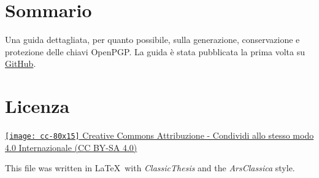 \begingroup
	\footnotesize

	\section*{Sommario}
	Una guida dettagliata, per quanto possibile, sulla generazione,
	conservazione e protezione delle chiavi OpenPGP. La guida è stata pubblicata
	la prima volta su
	\href{https://github.com/aldolat/generazione-sicura-chiavi-openpgp}{GitHub}.

	\section*{Licenza}
	\href{https://creativecommons.org/licenses/by-sa/4.0/deed.it}{\texttt{[image: cc-80x15]}
	Creative Commons Attribuzione - Condividi allo stesso modo 4.0 Internazionale
	(CC BY-SA 4.0)} \bigskip

	\vfill

	\noindent This file was written in \LaTeX~with \textit{ClassicThesis} and
	the \textit{ArsClassica} style.

\endgroup